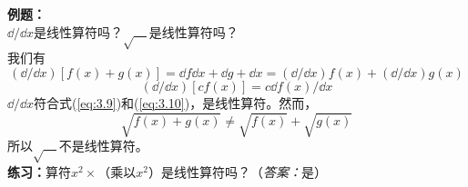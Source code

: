 	\begin{examplebox}
		\textbf{例题：}\\
		$\dd /\dd x$是线性算符吗？$\sqrt{\quad}$是线性算符吗？\\
		
		我们有
		\begin{equation*}
			\left(\dd /\dd x\right) \left[f\left(x\right)+g\left(x\right)\right] = \dd f\dd x+\dd g+\dd x=\left(\dd /\dd x\right)f\left(x\right)+\left(\dd /\dd x\right)g\left(x\right)
		\end{equation*}
		\begin{equation*}
			\left(\dd /\dd x\right)\left[cf\left(x\right)\right] = c \dd f\left(x\right) /\dd x
		\end{equation*}
		$\dd /\dd x$符合式(\ref{eq:3.9})和(\ref{eq:3.10})，是线性算符。然而，
		\begin{equation*}
			\sqrt{f\left(x\right)+g\left(x\right)} \neq \sqrt{f\left(x\right)} +\sqrt{g\left(x\right)}
		\end{equation*}
		所以$\sqrt{\quad}$不是线性算符。\\
		
		\textbf{练习：}算符$x^2\times$（乘以$x^2$）是线性算符吗？（\textit{答案：}是）
	\end{examplebox}

